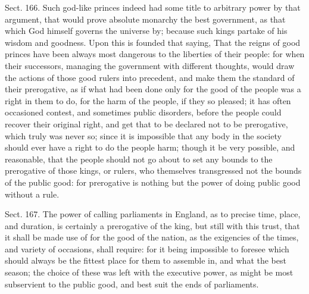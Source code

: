 \documentclass[11pt,openany]{book}
\begin{document}
Sect. 166. Such god-like princes indeed had some title to arbitrary power by that argument, that would prove absolute monarchy the best government, as that which God himself governs the universe by; because such kings partake of his wisdom and goodness. Upon this is founded that saying, That the reigns of good princes have been always most dangerous to the liberties of their people: for when their successors, managing the government with different thoughts, would draw the actions of those good rulers into precedent, and make them the standard of their prerogative, as if what had been done only for the good of the people was a right in them to do, for the harm of the people, if they so pleased; it has often occasioned contest, and sometimes public disorders, before the people could recover their original right, and get that to be declared not to be prerogative, which truly was never so; since it is impossible that any body in the society should ever have a right to do the people harm; though it be very possible, and reasonable, that the people should not go about to set any bounds to the prerogative of those kings, or rulers, who themselves transgressed not the bounds of the public good: for prerogative is nothing but the power of doing public good without a rule.

Sect. 167. The power of calling parliaments in England, as to precise time, place, and duration, is certainly a prerogative of the king, but still with this trust, that it shall be made use of for the good of the nation, as the exigencies of the times, and variety of occasions, shall require: for it being impossible to foresee which should always be the fittest place for them to assemble in, and what the best season; the choice of these was left with the executive power, as might be most subservient to the public good, and best suit the ends of parliaments.
\end{document}
